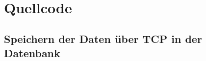 \chapter{Quellcode}
\label{quellcode}

\section{Speichern der Daten über TCP in der Datenbank}
\label{save_data_tcp_code_gru}











